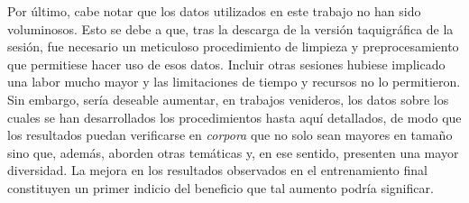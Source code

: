 Por \'ultimo, cabe notar que los datos utilizados en este trabajo
no han sido voluminosos. Esto se debe a que, tras la descarga
de la versi\'on taquigr\'afica de la sesi\'on, fue necesario un
meticuloso procedimiento de limpieza y preprocesamiento que permitiese
hacer uso de esos datos. Incluir otras sesiones hubiese implicado
una labor mucho mayor y las limitaciones de tiempo y recursos no
lo permitieron. Sin embargo, ser\'ia deseable aumentar, en trabajos
venideros, los datos sobre los cuales se han desarrollados los procedimientos
hasta aqu\'i detallados, de modo que los resultados puedan verificarse en
\textit{corpora} que no solo sean mayores en tamaño sino que, adem\'as,
aborden otras tem\'aticas y, en ese sentido, presenten una mayor
diversidad. La mejora en los resultados observados en el entrenamiento
final constituyen un primer indicio del beneficio que tal aumento podr\'ia
significar.